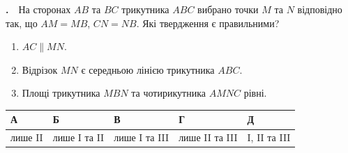 \documentclass[12pt]{article}
\renewcommand{\headrulewidth}{0.4pt}
\renewcommand{\footrulewidth}{0.4pt}
\newlength{\nmtcellw}
\newcommand{\nmtSetCell}{\setlength{\nmtcellw}{\dimexpr(\linewidth-10\tabcolsep-6\arrayrulewidth)/5\relax}}
\newcommand{\answerTable}[5]{%
\par\nopagebreak\vspace{0.15cm}
\noindent\nmtSetCell
\begin{tabular}{|*{5}{>{\centering\arraybackslash}m{\nmtcellw}|}}
\hline
\rule[-0.15cm]{0pt}{0.6cm}\textbf{А} & \rule[-0.15cm]{0pt}{0.6cm}\textbf{Б} & \rule[-0.15cm]{0pt}{0.6cm}\textbf{В} & \rule[-0.15cm]{0pt}{0.6cm}\textbf{Г} & \rule[-0.15cm]{0pt}{0.6cm}\textbf{Д} \\
\hline
\rule[-0.2cm]{0pt}{0.75cm}#1 & \rule[-0.2cm]{0pt}{0.75cm}#2 & \rule[-0.2cm]{0pt}{0.75cm}#3 & \rule[-0.2cm]{0pt}{0.75cm}#4 & \rule[-0.2cm]{0pt}{0.75cm}#5 \\
\hline
\end{tabular}
\par\vspace{0.25cm}
}
\newcounter{zad}
\newcommand{\zadtask}[1]{\stepcounter{zad}\noindent\textbf{\thezad.}\ \ #1\par\nopagebreak\vspace{0.2cm}}
\newcounter{ans}
\newcommand{\nbvspace}[1]{\nopagebreak\vspace{#1}}
\begin{document}
\begin{samepage}
\zadtask{На сторонах $AB$ та $BC$ трикутника $ABC$ вибрано точки $M$ та $N$ відповідно так, що $AM = MB$, $CN = NB$. Які твердження є правильними?\par
\nopagebreak\nbvspace{0.1cm}
\begin{enumerate}[label=\textbf{\Roman*.}, align=left, leftmargin=2.6em, labelsep=0.5em, itemsep=2pt, topsep=2pt]
\item $AC \parallel MN$.
\item Відрізок $MN$ є середньою лінією трикутника $ABC$.
\item Площі трикутника $MBN$ та чотирикутника $AMNC$ рівні.
\end{enumerate}
\nopagebreak\nbvspace{0.1cm}}
\answerTable{лише II}{лише I та II}{лише I та III}{лише II та III}{I, II та III}
\par{}
\end{samepage}
\endgroup

\begingroup
\renewcommand{\headrulewidth}{0.4pt}
\renewcommand{\footrulewidth}{0.4pt}
\end{document}
